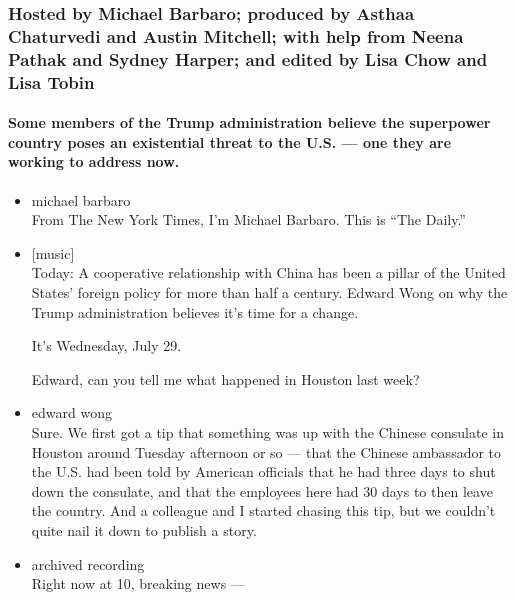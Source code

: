 \hypertarget{hosted-by-michael-barbaro-produced-by-asthaa-chaturvedi-and-austin-mitchell-with-help-from-neena-pathak-and-sydney-harper-and-edited-by-lisa-chow-and-lisa-tobin}{%
\subsubsection{Hosted by Michael Barbaro; produced by Asthaa Chaturvedi
and Austin Mitchell; with help from Neena Pathak and Sydney Harper; and
edited by Lisa Chow and Lisa
Tobin}\label{hosted-by-michael-barbaro-produced-by-asthaa-chaturvedi-and-austin-mitchell-with-help-from-neena-pathak-and-sydney-harper-and-edited-by-lisa-chow-and-lisa-tobin}}

\hypertarget{some-members-of-the-trump-administration-believe-the-superpower-country-poses-an-existential-threat-to-the-us--one-they-are-working-to-address-now}{%
\paragraph{Some members of the Trump administration believe the
superpower country poses an existential threat to the U.S. --- one they
are working to address
now.}\label{some-members-of-the-trump-administration-believe-the-superpower-country-poses-an-existential-threat-to-the-us--one-they-are-working-to-address-now}}

\begin{itemize}
\item
  michael barbaro\\
  From The New York Times, I'm Michael Barbaro. This is ``The Daily.''
\item
  {[}music{]}\\
  Today: A cooperative relationship with China has been a pillar of the
  United States' foreign policy for more than half a century. Edward
  Wong on why the Trump administration believes it's time for a change.

  It's Wednesday, July 29.

  Edward, can you tell me what happened in Houston last week?
\item
  edward wong\\
  Sure. We first got a tip that something was up with the Chinese
  consulate in Houston around Tuesday afternoon or so --- that the
  Chinese ambassador to the U.S. had been told by American officials
  that he had three days to shut down the consulate, and that the
  employees here had 30 days to then leave the country. And a colleague
  and I started chasing this tip, but we couldn't quite nail it down to
  publish a story.
\item
  archived recording\\
  Right now at 10, breaking news ---
\end{itemize}

